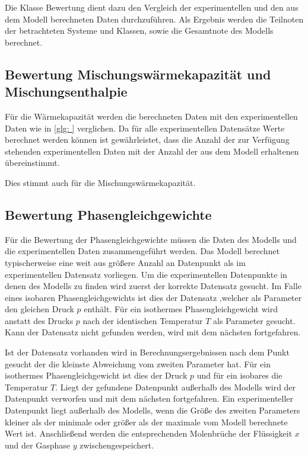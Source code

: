 \documentclass[../thesis.tex]{subfiles}
\begin{document}
Die Klasse Bewertung dient dazu den Vergleich der experimentellen und den aus dem Modell berechneten Daten durchzuführen. Als Ergebnis werden die Teilnoten der betrachteten Systeme und Klassen, sowie die Gesamtnote des Modells berechnet.

\subsection{Bewertung Mischungswärmekapazität und Mischungsenthalpie}

Für die Wärmekapazität werden die berechneten Daten mit den experimentellen Daten wie in \autoref{glg: } verglichen. Da für alle experimentellen Datensätze Werte berechnet werden können ist gewährleistet, dass die Anzahl der zur Verfügung stehenden experimentellen Daten mit der Anzahl der aus dem Modell erhaltenen übereinstimmt.

Dies stimmt auch für die Mischungswärmekapazität.

\subsection{Bewertung Phasengleichgewichte}

Für die Bewertung der Phasengleichgewichte müssen die Daten des Modells und die experimentellen Daten zusammengeführt werden. Das Modell berechnet typischerweise eine weit aus größere Anzahl an Datenpunkt als im experimentellen Datensatz vorliegen.  Um die experimentellen Datenpunkte in denen des Modells zu finden wird zuerst der korrekte Datensatz gesucht. Im Falle eines isobaren Phasengleichgewichts ist dies der Datensatz ,welcher als Parameter den gleichen Druck $p$ enthält. Für ein isothermes Phasengleichgewicht wird anstatt des Drucks $p$ nach der identischen Temperatur $T$ als Parameter gesucht. Kann der Datensatz nicht gefunden werden, wird mit dem nächsten fortgefahren.

Ist der Datensatz vorhanden wird in Berechnungsergebnissen nach dem Punkt gesucht der die kleinste Abweichung vom zweiten Parameter hat. Für ein isothermes Phasengleichgewicht ist dies der Druck $p$ und für ein isobares die Temperatur $T$. Liegt der gefundene Datenpunkt außerhalb des Modells wird der Datenpunkt verworfen und mit dem nächsten fortgefahren. Ein experimenteller Datenpunkt liegt außerhalb des Modells, wenn die Größe des zweiten Parameters kleiner als der minimale oder größer als der maximale vom Modell berechnete Wert ist. Anschließend werden die entsprechenden Molenbrüche der Flüssigkeit $x$ und der Gasphase $y$ zwischengespeichert.
\end{document}
